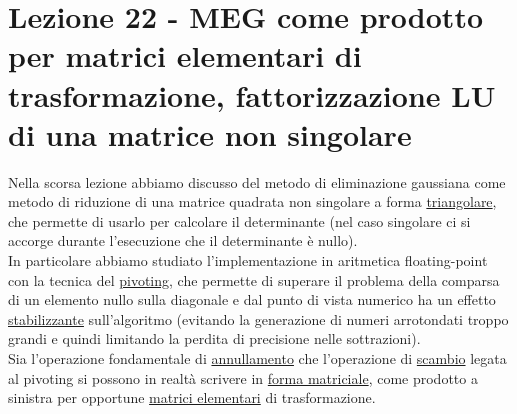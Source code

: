 \documentclass[12pt,a4paper]{article}
\begin{document}
\section[Lezione 22 - Fattorizzazione LU]{Lezione 22 - MEG come prodotto per matrici elementari di trasformazione, fattorizzazione LU di una matrice non singolare}
Nella scorsa lezione abbiamo discusso del metodo di eliminazione gaussiana come metodo di riduzione di una matrice quadrata non singolare a forma \uline{triangolare}, che permette di usarlo per calcolare il determinante (nel caso singolare ci si accorge durante l'esecuzione che il determinante è nullo).\\In particolare abbiamo studiato l'implementazione in aritmetica floating-point con la tecnica del \uline{pivoting}, che permette di superare il problema della comparsa di un elemento nullo sulla diagonale e dal punto di vista numerico ha un effetto \uline{stabilizzante} sull'algoritmo (evitando la generazione di numeri arrotondati troppo grandi e quindi limitando la perdita di precisione nelle sottrazioni).\\
Sia l'operazione fondamentale di \uline{annullamento} che l'operazione di \uline{scambio} legata al pivoting si possono in realtà scrivere in \uline{forma matriciale}, come prodotto a sinistra per opportune \uline{matrici elementari} di trasformazione.
\end{document}
